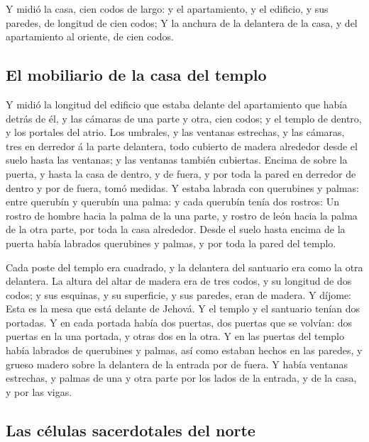  Y midió la casa, cien codos de largo: y el apartamiento, y
el edificio, y sus paredes, de longitud de cien codos;  Y
la anchura de la delantera de la casa, y del apartamiento al oriente, de
cien codos.

\hypertarget{el-mobiliario-de-la-casa-del-templo}{%
\subsection{El mobiliario de la casa del
templo}\label{el-mobiliario-de-la-casa-del-templo}}

 Y midió la longitud del edificio que estaba delante del
apartamiento que había detrás de él, y las cámaras de una parte y otra,
cien codos; y el templo de dentro, y los portales del atrio.
 Los umbrales, y las ventanas estrechas, y las cámaras,
tres en derredor á la parte delantera, todo cubierto de madera alrededor
desde el suelo hasta las ventanas; y las ventanas también cubiertas.
 Encima de sobre la puerta, y hasta la casa de dentro, y de
fuera, y por toda la pared en derredor de dentro y por de fuera, tomó
medidas.  Y estaba labrada con querubines y palmas: entre
querubín y querubín una palma: y cada querubín tenía dos rostros:
 Un rostro de hombre hacia la palma de la una parte, y
rostro de león hacia la palma de la otra parte, por toda la casa
alrededor.  Desde el suelo hasta encima de la puerta había
labrados querubines y palmas, y por toda la pared del templo.

 Cada poste del templo era cuadrado, y la delantera del
santuario era como la otra delantera.  La altura del altar
de madera era de tres codos, y su longitud de dos codos; y sus esquinas,
y su superficie, y sus paredes, eran de madera. Y díjome: Esta es la
mesa que está delante de Jehová.  Y el templo y el
santuario tenían dos portadas.  Y en cada portada había dos
puertas, dos puertas que se volvían: dos puertas en la una portada, y
otras dos en la otra.  Y en las puertas del templo había
labrados de querubines y palmas, así como estaban hechos en las paredes,
y grueso madero sobre la delantera de la entrada por de fuera.
 Y había ventanas estrechas, y palmas de una y otra parte
por los lados de la entrada, y de la casa, y por las vigas.

\hypertarget{las-cuxe9lulas-sacerdotales-del-norte}{%
\subsection{Las células sacerdotales del
norte}\label{las-cuxe9lulas-sacerdotales-del-norte}}

